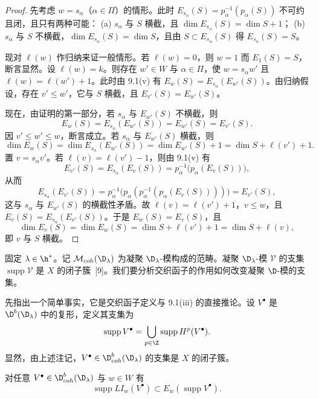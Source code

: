 \begin{proof}
先考虑 $w=s_\alpha$（$\alpha\in\Pi$）的情形。此时 $E_{s_\alpha}(S)=p_\alpha^{-1}(p_\alpha(S))$ 不可约且闭，且只有两种可能：
(a) $s_\alpha$ 与 $S$ 横截，且 $\dim E_{s_\alpha}(S)=\dim S+1$；
(b) $s_\alpha$ 与 $S$ 不横截，$\dim E_{s_\alpha}(S)=\dim S$，且由 $S\subset E_{s_\alpha}(S)$ 得 $E_{s_\alpha}(S)=S$。

现对 $\ell(w)$ 作归纳来证一般情形。若 $\ell(w)=0$，则 $w=1$ 而 $E_1(S)=S$，断言显然。设 $\ell(w)=k$。则存在 $w'\in W$ 与 $\alpha\in\Pi$，使 $w=s_\alpha w'$ 且 $\ell(w)=\ell(w')+1$。此时由 9.1(v) 有 $E_w(S)=E_{s_\alpha}(E_{w'}(S))$。由归纳假设，存在 $v'\le w'$，它与 $S$ 横截，且 $E_{v'}(S)=E_{w'}(S)$。

现在，由证明的第一部分，若 $s_\alpha$ 与 $E_{w'}(S)$ 不横截，则
$$E_w(S)=E_{s_\alpha}(E_{w'}(S))=E_{w'}(S)=E_{v'}(S).$$
因 $v'\le w'\le w$，断言成立。若 $s_\alpha$ 与 $E_{w'}(S)$ 横截，则
$$\dim E_w(S)=\dim E_{s_\alpha}(E_{w'}(S))=\dim E_{w'}(S)+1=\dim S+\ell(v')+1.$$
置 $v=s_\alpha v'$。若 $\ell(v)=\ell(v')-1$，则由 9.1(v) 有
$$E_{v'}(S)=E_{s_\alpha}(E_v(S))=p_\alpha^{-1}\bigl(p_\alpha(E_v(S))\bigr),$$
从而
$$E_{s_\alpha}(E_{v'}(S))=p_\alpha^{-1}\bigl(p_\alpha(p_\alpha^{-1}(p_\alpha(E_v(S))))\bigr)=E_{v'}(S),$$
这与 $s_\alpha$ 与 $E_{w'}(S)$ 的横截性矛盾。故 $\ell(v)=\ell(v')+1$，$v\le w$，且 $E_v(S)=E_{s_\alpha}(E_{v'}(S))$。于是 $E_w(S)=E_v(S)$，且
$$\dim E_v(S)=\dim E_w(S)=\dim S+\ell(v')+1=\dim S+\ell(v),$$
即 $v$ 与 $S$ 横截。
\end{proof}

固定 $\lambda\in\h^*$。记 $\mathcal{M}_{coh}(\D_\lambda)$ 为凝聚 $\D_\lambda$-模构成的范畴。凝聚 $\D_\lambda$-模 $\mathcal{V}$ 的支集 $\operatorname{supp}\mathcal{V}$ 是 $X$ 的闭子簇~[9]。我们要分析交织函子的作用如何改变凝聚 $\D$-模的支集。

先指出一个简单事实，它是交织函子定义与 9.1(iii) 的直接推论。设 $V^\bullet$ 是 $\D^b(\D_\lambda)$ 中的复形，定义其支集为
$$\operatorname{supp}V^\bullet=\bigcup_{p\in\Z}\operatorname{supp}H^p(V^\bullet).$$
显然，由上述注记，$V^\bullet\in\D^b_{coh}(\D_\lambda)$ 的支集是 $X$ 的闭子簇。

\begin{lemma}\label{lem:03.9.4}
对任意 $V^\bullet\in\D^b_{coh}(\D_\lambda)$ 与 $w\in W$ 有
$$\operatorname{supp}LI_w(V^\bullet)\subset E_w(\operatorname{supp}V^\bullet).$$
\end{lemma}

